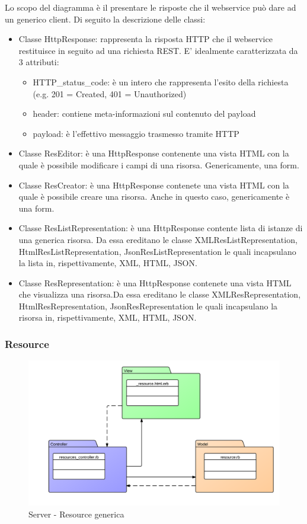 {{Lo scopo del diagramma è il presentare le risposte che il webservice può dare ad un generico client. Di seguito la descrizione delle classi:

\begin{itemize}
\item Classe HttpResponse: rappresenta la risposta HTTP che il webservice restituisce in seguito ad una richiesta REST. E' idealmente caratterizzata da 3 attributi:
\begin{itemize}
\item HTTP\_status\_code: è un intero che rappresenta l'esito della richiesta (e.g. 201 = Created, 401 = Unauthorized)
\item header: contiene meta-informazioni sul contenuto del payload
\item payload: è l'effettivo messaggio trasmesso tramite HTTP 
\end{itemize}
\item Classe ResEditor: è una HttpResponse contenente una vista HTML con la quale è possibile modificare i campi di una risorsa. Genericamente, una form.
\item Classe ResCreator: è una HttpResponse contenete una vista HTML con la quale è possibile creare una risorsa. Anche in questo caso, genericamente è una form.
\item Classe ResListRepresentation:  è una HttpResponse contente lista di istanze di una generica risorsa. Da essa ereditano le classe XMLResListRepresentation, HtmlResListRepresentation, JsonResListRepresentation le quali incapsulano la lista in, rispettivamente, XML, HTML, JSON.
\item Classe ResRepresentation: è una HttpResponse contenete una vista HTML che visualizza una risorsa.Da essa ereditano le classe XMLResRepresentation, HtmlResRepresentation, JsonResRepresentation le quali incapsulano la risorsa in, rispettivamente, XML, HTML, JSON.
\end{itemize}

\subsubsection{Resource}
\label{resource}

\begin{figure}[H]
\centering
\includegraphics[scale=0.70]{images/cap2/Server/MvcResource.png}
\caption{Server - Resource generica}
\end{figure}

}}

